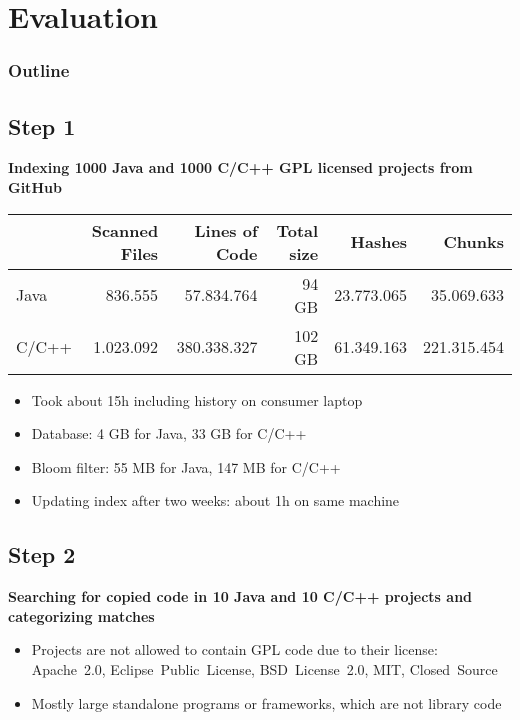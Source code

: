 
\section{Evaluation}
\begin{frame}
	\frametitle{Outline} 
	\tableofcontents[
		currentsection,
		subsectionstyle=hide
	]
\end{frame}

\subsection{Step 1}
\begin{frame}{\insertsubsection}
	\textbf{Indexing 1000 Java and 1000 C/C++ GPL licensed projects from GitHub}
	
	\begin{table}[ht]
		\centering
		\scriptsize
		\begin{tabular}{l|rrrrr}
			& \textbf{Scanned Files} & \textbf{Lines of Code} & \textbf{Total size} & \textbf{Hashes} & \textbf{Chunks} \\ 
			\hline 
			Java & 836.555 & 57.834.764 & 94 GB & 23.773.065 & 35.069.633 \\
			C/C++ & 1.023.092 & 380.338.327 & 102 GB & 61.349.163 & 221.315.454 \\ 
		\end{tabular}
	\end{table}

	\begin{itemize}
		\small
		\item Took about 15h including history on consumer laptop
		\item Database: 4 GB for Java, 33 GB for C/C++
		\item Bloom filter: 55 MB for Java, 147 MB for C/C++
		\item Updating index after two weeks: about 1h on same machine
	\end{itemize}
\end{frame}

\subsection{Step 2}
\begin{frame}{\insertsubsection}
	\textbf{Searching for copied code in 10 Java and 10 C/C++ projects and categorizing matches}
	
	\begin{itemize}
		\item Projects are not allowed to contain GPL code due to their license: Apache~2.0, Eclipse~Public~License, BSD~License~2.0, MIT, Closed~Source
		\item Mostly large standalone programs or frameworks, which are not library code
	\end{itemize}
\end{frame}


